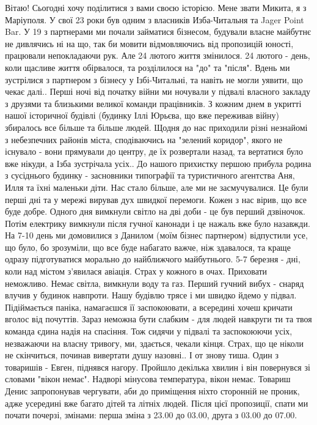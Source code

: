Вітаю! Сьогодні хочу поділитися з вами своєю історією. Мене звати Микита, я з Маріуполя. У свої 23 роки був одним з власників Изба-Читальня та Jager Point Bar.
У 19 з партнерами ми почали займатися бізнесом, будували власне майбутнє не дивлячись ні на що, так би мовити відмовляючись від пропозицій юності, працювали непокладаючи рук. Але 24 лютого життя змінилося. 
24 лютого - день, коли щасливе життя обірвалося, та розділилося на "до" та "після". Вдень ми зустрілися з партнером з бізнесу у Ізбі-Читальні, та навіть не могли уявити, що чекає далі.. Перші ночі від початку війни ми ночували у підвалі власного закладу з друзями та близькими великої команди працівників. З кожним днем в укритті нашої історичної будівлі (будинку Іллі Юрьєва, що вже переживав війну) збиралось все більше та більше людей. Щодня до нас приходили різні незнайомі з небезпечних районів міста, сподіваючись на "зелений коридор", якого не існувало - вони прямували до центру, де їх розвертали назад, та вертатися було вже нікуди, а Ізба зустрічала усіх.. 
До нашого прихистку першою прибула родина з сусіднього будинку - засновники типографії  та туристичного агентства
Аня, Илля та їхні маленьки діти. 
Нас стало більше, але ми не засмучувалися. Це були перші дні та у мережі вирував дух швидкої перемоги. Кожен з нас вірив, що все буде добре. 
Одного дня вимкнули світло на дві доби - це був перший дзвіночок. Потім електрику вимкнули після гучної канонади і це нажаль вже було назавжди. На 7-10 день ми домовилися з Данилом (моїм бізнес партнером) відпустили усе, що було, бо зрозуміли, що все буде набагато важче, ніж здавалося, та краще одразу підготуватися морально до найближчого майбутнього. 5-7 березня - дні, коли над містом з'явилася авіація. Страх у кожного в очах. Приховати неможливо. Немає світла, вимкнули воду та газ. 
Перший гучний вибух - снаряд влучив у будинок навпроти. Нашу будівлю трясе і ми швидко йдемо у підвал. Підіймається паніка, намагаєшся її заспокоювати, а всередині хочеш кричати вголос від почуттів. Зараз неможна бути слабким - для людей навкруги ти та твоя команда єдина надія на спасіння. Тож сидячи у підвалі та заспокоюючи усіх, незважаючи на власну тривогу, ми, здається, чекали кінця. Страх, що це ніколи не скінчиться, починав вивертати душу назовні.. І от знову тиша. Один з товаришів - Евген, піднявся нагору. Пройшло декілька хвилин і він повернувся зі словами "вікон немає". Надворі мінусова температура, вікон немає. Товариш Денис запропонував чергувати, аби до приміщення ніхто сторонній не проник, адже усередині вже багато дітей та літніх людей. Після цієї пропозиції, спати ми почати почерзі, змінами: перша зміна з 23.00 до 03.00, друга з 03.00 до 07.00. 
